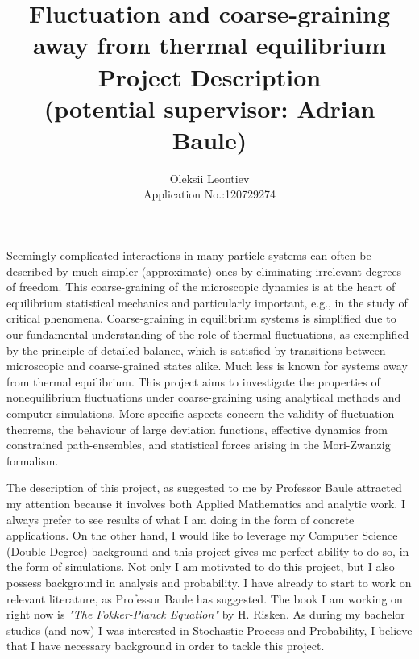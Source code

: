 \documentclass[10pt]{article}
\title{Fluctuation and coarse-graining away from thermal equilibrium\\
Project Description\\(potential supervisor: Adrian Baule)
}
\author{Oleksii Leontiev\\Application No.:120729274}
\begin{document}
\maketitle
Seemingly complicated interactions in many-particle systems can often be described by much simpler
(approximate) ones by eliminating irrelevant degrees of freedom. This coarse-graining of the
microscopic dynamics is at the heart of equilibrium statistical mechanics and particularly important,
e.g., in the study of critical phenomena. Coarse-graining in equilibrium systems is simplified due to
our fundamental understanding of the role of thermal fluctuations, as exemplified by the principle of
detailed balance, which is satisfied by transitions between microscopic and coarse-grained states alike.
Much less is known for systems away from thermal equilibrium. This project aims to investigate the properties
of nonequilibrium fluctuations under coarse-graining using analytical methods and computer simulations.
More specific aspects concern the validity of fluctuation theorems, the behaviour of large deviation functions,
effective dynamics from constrained path-ensembles, and statistical forces arising in the Mori-Zwanzig formalism.

The description of this project, as suggested to me by Professor Baule attracted my attention because it involves both Applied Mathematics
and analytic work. I always prefer to see results of what I am doing in the form of concrete applications. On the other hand, I would
like to leverage my Computer Science (Double Degree) background and this project gives me perfect ability to do so, in the form of simulations.
Not only I am motivated to do this project, but I also possess background in analysis and probability. I have already to start to work on 
relevant literature, as Professor Baule has suggested. The book I am working on right now is {\em "The Fokker-Planck Equation"} by H. Risken.
As during my bachelor studies (and now) I was interested in Stochastic Process and Probability, I believe that I have necessary background
in order to tackle this project.
\end{document}
